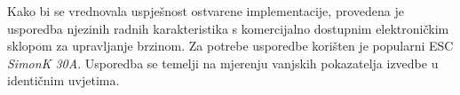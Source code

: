 \documentclass[diplomskirad]{fer}
\begin{document}
Kako bi se vrednovala uspješnost ostvarene implementacije, provedena je
usporedba njezinih radnih karakteristika s komercijalno dostupnim elektroničkim
sklopom za upravljanje brzinom. Za potrebe usporedbe korišten je popularni ESC
\textit{SimonK 30A}. Usporedba se temelji na mjerenju vanjskih pokazatelja
izvedbe u identičnim uvjetima.

%
%
%
%
%
%
\end{document}
